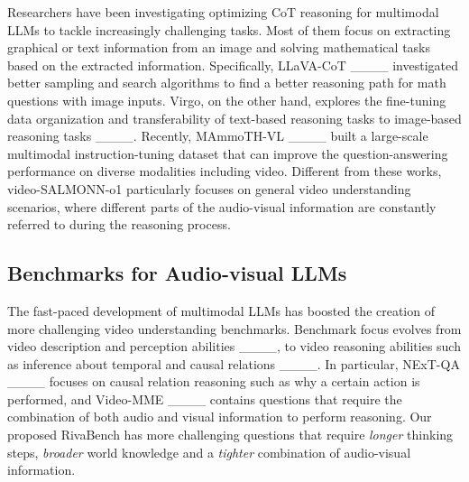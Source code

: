 Researchers have been investigating optimizing CoT reasoning for multimodal LLMs to tackle increasingly challenging tasks. Most of them focus on extracting graphical or text information from an image and solving mathematical tasks based on the extracted information. Specifically, LLaVA-CoT ____ investigated better sampling and search algorithms to find a better reasoning path for math questions with image inputs. Virgo, on the other hand, explores the fine-tuning data organization and transferability of text-based reasoning tasks to image-based reasoning tasks ____. Recently, MAmmoTH-VL ____ built a large-scale multimodal instruction-tuning dataset that can improve the question-answering performance on diverse modalities including video. Different from these works, video-SALMONN-o1 particularly focuses on general video understanding scenarios, where different parts of the audio-visual information are constantly referred to during the reasoning process.



\subsection{Benchmarks for Audio-visual LLMs}


The fast-paced development of multimodal LLMs has boosted the creation of more challenging video understanding benchmarks. Benchmark focus evolves from video description and perception abilities ____, to video reasoning abilities such as inference about temporal and causal relations ____. In particular, NExT-QA ____ focuses on causal relation reasoning such as why a certain action is performed, and Video-MME ____ contains questions that require the combination of both audio and visual information to perform reasoning. Our proposed RivaBench has more challenging questions that require \textit{longer} thinking steps, \textit{broader} world knowledge and a \textit{tighter} combination of audio-visual information.


\vspace{-0.3cm}